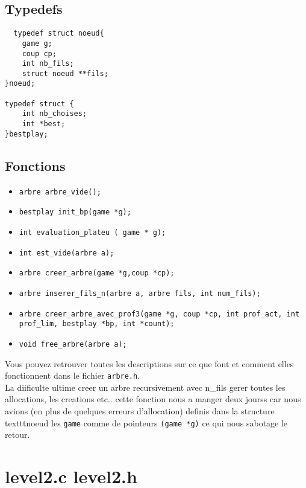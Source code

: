 \documentclass[11pt,a4paper]{article}
\begin{document}
\subsection{Typedefs}

\begin{lstlisting}
  typedef struct noeud{
    game g;
    coup cp;
    int nb_fils;
    struct noeud **fils;
}noeud;

typedef struct {
    int nb_choises;
    int *best;
}bestplay;
\end{lstlisting}

\subsection{Fonctions}

\begin{itemize}

\item \texttt{arbre arbre\_vide();}
\item \texttt{bestplay init\_bp(game *g);}
\item \texttt{int evaluation\_plateu ( game * g);}
\item \texttt{int est\_vide(arbre a);}
\item \texttt{arbre creer\_arbre(game *g,coup *cp);}
\item \texttt{arbre inserer\_fils\_n(arbre a, arbre fils, int num\_fils);}
\item \texttt{arbre creer\_arbre\_avec\_prof3(game *g, coup *cp, int prof\_act, int prof\_lim, bestplay *bp, int *count);}
\item \texttt{void free\_arbre(arbre a);}

\end{itemize}

Vous pouvez retrouver toutes les descriptions sur ce que font et comment elles fonctionnent dans le fichier \texttt{arbre.h}.\\

La diificulte ultime creer un arbre recursivement avec n\_fils gerer toutes les allocations, les creations etc.. cette fonction nous a manger deux jourss car nous avions (en plus de quelques erreurs d'allocation) definis dans la structure texttt{noeud} les \texttt{game} comme de pointeurs \texttt{(game *g)} ce qui nous sabotage le retour.

\section{level2.c level2.h}
\end{document}

